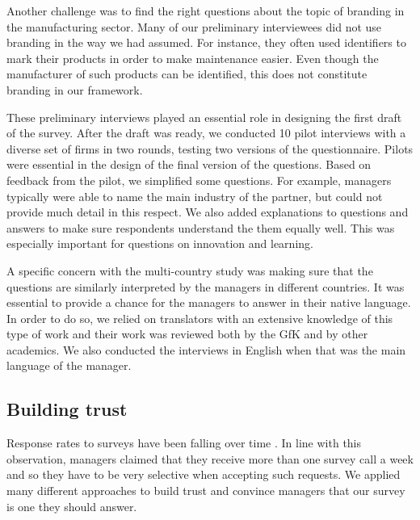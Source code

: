 \documentclass[final, dvipsnames, authoryear,12pt]{elsarticle}
\begin{document}
Another challenge was to find the right questions about the topic of branding in the manufacturing sector. Many of our preliminary interviewees did not use branding in the way we had assumed. For instance, they often used identifiers to mark their products in order to make maintenance easier. Even though the manufacturer of such products can be identified, this does not constitute branding in our framework.

These preliminary interviews played an essential role in designing the first draft of the survey. After the draft was ready, we conducted 10 pilot interviews with a diverse set of firms in two rounds, testing two versions of the questionnaire. Pilots were essential in the design of  the final version of the questions. Based on feedback from the pilot, we simplified some questions. For example, managers typically were able to name the main industry of the partner, but could not provide much detail in this respect. We also added explanations to questions and answers to make sure respondents understand the them equally well. This was especially important for questions on innovation and learning. 

A specific concern with the multi-country study was making sure that the questions are similarly interpreted by the managers in different countries. It was essential to provide a chance for the managers to answer in their native language. In order to do so, we relied on translators with an extensive knowledge of this type of work and their work was reviewed both by the GfK and by other academics. We also conducted the interviews in English when that was the main language of the manager.


\subsection{Building trust}
\label{sec:trust}

Response rates to surveys have been falling over time \citep{Bloom2014-hc}. In line with this observation, managers claimed that they receive more than one survey call a week and so they have to be very selective when accepting such requests. We applied many different approaches to build trust and convince managers that our survey is one they should answer.
\end{document}
